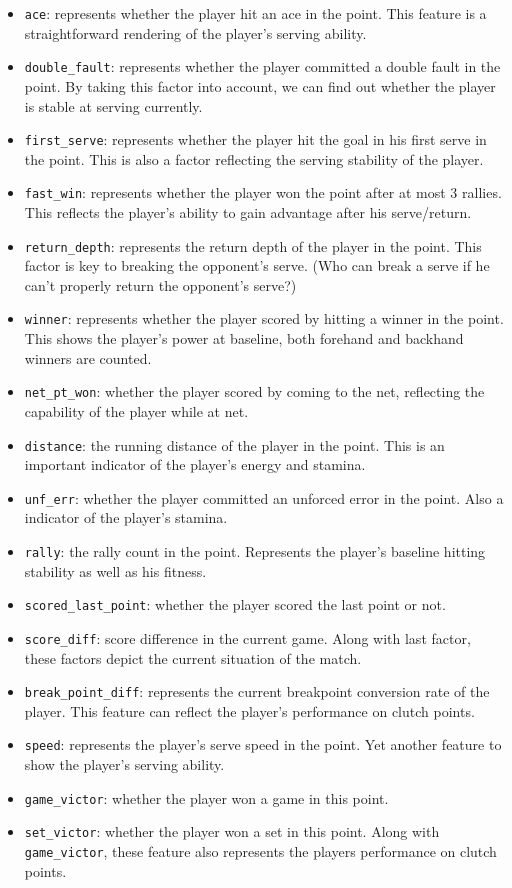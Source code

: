 \begin{itemize}
    \item \verb|ace|: represents whether the player hit an ace in the point. This feature is a straightforward rendering of the player's serving ability.
    \item \verb|double_fault|: represents whether the player committed a double fault in the point. By taking this factor into account, we can find out whether the player is stable at serving currently.
    \item \verb|first_serve|: represents whether the player hit the goal in his first serve in the point. This is also a factor reflecting the serving stability of the player.
    \item \verb|fast_win|: represents whether the player won the point after at most 3 rallies. This reflects the player's ability to gain advantage after his serve/return.
    \item \verb|return_depth|: represents the return depth of the player in the point. This factor is key to breaking the opponent's serve. (Who can break a serve if he can't properly return the opponent's serve?)
    \item \verb|winner|: represents whether the player scored by hitting a winner in the point. This shows the player's power at baseline, both forehand and backhand winners are counted.
    \item \verb|net_pt_won|: whether the player scored by coming to the net, reflecting the capability of the player while at net.
    \item \verb|distance|: the running distance of the player in the point. This is an important indicator of the player's energy and stamina.
    \item \verb|unf_err|: whether the player committed an unforced error in the point. Also a indicator of the player's stamina.
    \item \verb|rally|: the rally count in the point. Represents the player's baseline hitting stability as well as his fitness.
    \item \verb|scored_last_point|: whether the player scored the last point or not.
    \item \verb|score_diff|: score difference in the current game. Along with last factor, these factors depict the current situation of the match.
    \item \verb|break_point_diff|: represents the current breakpoint conversion rate of the player. This feature can reflect the player's performance on clutch points.
    \item \verb|speed|: represents the player's serve speed in the point. Yet another feature to show the player's serving ability.
    \item \verb|game_victor|: whether the player won a game in this point.
    \item \verb|set_victor|: whether the player won a set in this point. Along with \verb|game_victor|, these feature also represents the players performance on clutch points.
\end{itemize}

